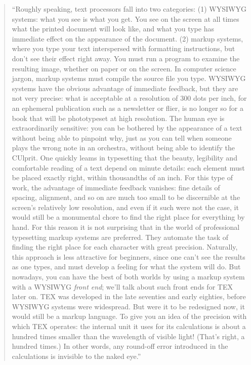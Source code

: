 \documentclass[]{tufte-book}
\begin{document}
\begin{quote}
``Roughly speaking, text processors fall into two categories:
(1) WYSIWYG systems: what you see is what you get. You see on the screen at all
times what the printed document will look like, and what you type has immediate
effect on the appearance of the document. (2) markup systems, where you type your text
interspersed with formatting instructions, but don't see their effect right away. You must run a program to examine the
resulting image, whether on paper or on the screen. In computer science jargon,
markup systems must compile the source file you type. WYSIWYG systems have the obvious
advantage of immediate feedback, but they
are not very precise: what is acceptable at a resolution of 300 dots per inch, for an
ephemeral publication such as a newsletter or flier, is no longer so for a book that
will be phototypeset at high resolution. The human eye is extraordinarily sensitive:
you can be bothered by the appearance of a text without being able to pinpoint why,
just as you can tell when someone plays the wrong note in an orchestra, without
being able to identify the CUlprit. One quickly leams in typesetting that the beauty,
legibility and comfortable reading of a text depend on minute details: each element
must be placed exactly right, within thousandths of an inch. For this type of work,
the advantage of immediate feedback vanishes: fine details of spacing, alignment,
and so on are much too small to be discernible at the screen's relatively low
resolution, and even if it such were not the case, it would still be a monumental chore
to find the right place for everything by hand. For this reason it is not surprising that in the world of professional typesetting
markup systems are preferred. They automate the task of finding the right place
for each character with great precision. Naturally, this approach is less attractive for
beginners, since one can't see the results as one types, and must develop a feeling
for what the system will do. But nowadays, you can have the best of both worlds
by using a markup system with a WYSIWYG \emph{front end}; we'll talk about such front
ends for TEX later on. TEX was developed in the late seventies and early eighties,
before WYSIWYG systems were widespread. But were it to be redesigned now, it would
still be a markup
language. To give you an idea of the precision with which TEX operates: the internal
unit it uses for its calculations is about a hundred times smaller than the
wavelength of visible light! (That's right, a hundred times.) In other words, any
round-off error introduced in the calculations is invisible to the naked eye.''
\citep{seroul2012beginner}
\end{quote}
\end{document}
